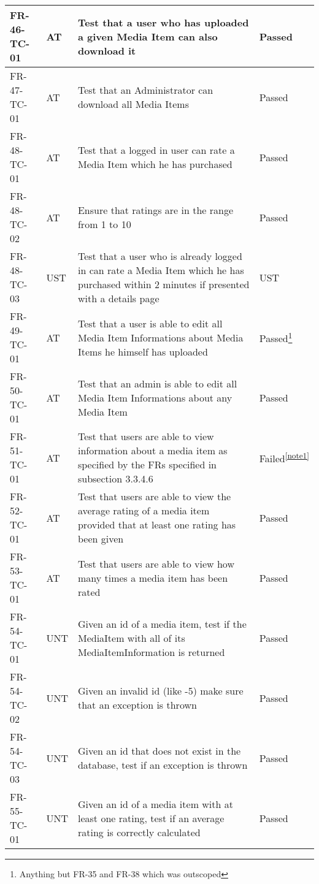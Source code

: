 \documentclass[../report.tex]{subfiles}
\newcommand{\footnoteref}[1]{\textsuperscript{\ref{#1}}}
\begin{document}
\begin{longtable}{|L{2.1cm}|L{1cm}|L{12.4cm}|L{1.4cm}|}
FR-46-TC-01&AT&Test that a user who has uploaded a given Media Item can also download it&Passed  \\ \hline
FR-47-TC-01&AT&Test that an Administrator can download all Media Items&Passed  \\ \hline
FR-48-TC-01&AT&Test that a logged in user can rate a Media Item which he has purchased&Passed  \\ \hline
FR-48-TC-02&AT&Ensure that ratings are in the range from 1 to 10&Passed  \\ \hline
FR-48-TC-03&UST&Test that a user who is already logged in can rate a Media Item which he has purchased within 2 minutes if presented with a details page&UST  \\ \hline
FR-49-TC-01&AT&Test that a user is able to edit all Media Item Informations about Media Items he himself has uploaded&Passed\footnote{Anything but FR-35 and FR-38 which was outscoped}  \\ \hline
FR-50-TC-01&AT&Test that an admin is able to edit all Media Item Informations about any Media Item&Passed  \\ \hline
FR-51-TC-01&AT&Test that users are able to view information about a media item as specified by the FRs specified in subsection 3.3.4.6&Failed\footnoteref{note1}  \\ \hline
FR-52-TC-01&AT&Test that users are able to view the average rating of a media item provided that at least one rating has been given&Passed  \\ \hline
FR-53-TC-01&AT&Test that users are able to view how many times a media item has been rated&Passed  \\ \hline
FR-54-TC-01&UNT&Given an id of a media item, test if the MediaItem with all of its MediaItemInformation is returned&Passed  \\ \hline
FR-54-TC-02&UNT&Given an invalid id (like -5) make sure that an exception is thrown&Passed  \\ \hline
FR-54-TC-03&UNT&Given an id that does not exist in the database, test if an exception is thrown&Passed  \\ \hline
FR-55-TC-01&UNT&Given an id of a media item with at least one rating, test if an average rating is correctly calculated &Passed  \\ \hline

\end{longtable}
\end{document}
